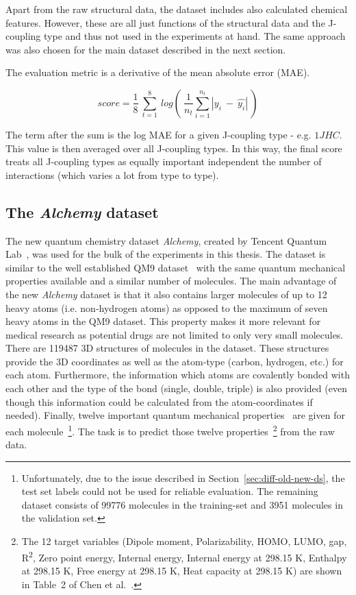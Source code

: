 Apart from the raw structural data, the dataset includes also calculated chemical features. However, these are all just functions of the structural data and the J-coupling type and thus not used in the experiments at hand. The same approach was also chosen for the main dataset described in the next section.

The evaluation metric is a derivative of the mean absolute error (MAE).

\begin{equation}\label{eq:champs-score}
	score = \frac{1}{8} ~ \sum_{t=1}^{8} ~ log(~\frac{1}{n_t} \sum_{i=1}^{n_t}|y_i~-~\hat{y_i}| ~)
\end{equation}

The term after the sum is the log MAE for a given J-coupling type - e.g. $1JHC$. This value is then averaged over all J-coupling types. In this way, the final score treats all J-coupling types as equally important independent the number of interactions (which varies a lot from type to type).

\subsection{The \textit{Alchemy} dataset}
\label{sec:alchemy-dataset}
The new quantum chemistry dataset \textit{Alchemy}, created by Tencent Quantum Lab~\cite{Chen2019}, was used for the bulk of the experiments in this thesis. The dataset is similar to the well established QM9 dataset~\cite{Ramakrishnan2014} with the same quantum mechanical properties available and a similar number of molecules. The main advantage of the new \textit{Alchemy} dataset is that it also contains larger molecules of up to 12 heavy atoms (i.e. non-hydrogen atoms) as opposed to the maximum of seven heavy atoms in the QM9 dataset. This property makes it more relevant for medical research as potential drugs are not limited to only very small molecules. 
There are 119487 3D structures of molecules in the dataset. These structures provide the 3D coordinates as well as the atom-type (carbon, hydrogen, etc.) for each atom. Furthermore, the information which atoms are covalently bonded with each other and the type of the bond (single, double, triple) is also provided (even though this information could be calculated from the atom-coordinates if needed). Finally, twelve important quantum mechanical properties~\cite{Chen2019} are given for each molecule~\footnote{
	Unfortunately, due to the issue described in Section~\ref{sec:diff-old-new-ds}, the test set labels could not be used for reliable evaluation. The remaining dataset consists of 99776 molecules in the training-set and 3951 molecules in the validation set.
}. The task is to predict those twelve properties~\footnote{
	The 12 target variables
	(Dipole moment, Polarizability, HOMO, LUMO, gap, R\textsuperscript2, Zero point energy, Internal energy, Internal energy at 298.15 K, Enthalpy at 298.15 K, Free energy at 298.15 K, Heat capacity at 298.15 K) are shown in Table~2 of Chen et al.~\cite{Chen2019}.
} from the raw data.


